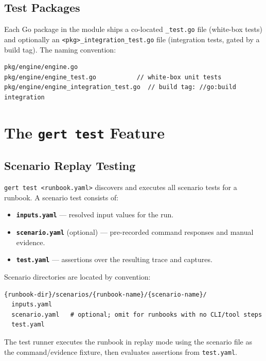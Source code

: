 \subsection{Test Packages}

Each Go package in the module ships a co-located \texttt{\_test.go} file (white-box tests) and optionally an \texttt{<pkg>\_integration\_test.go} file (integration tests, gated by a build tag). The naming convention:

\begin{verbatim}
pkg/engine/engine.go
pkg/engine/engine_test.go           // white-box unit tests
pkg/engine/engine_integration_test.go  // build tag: //go:build integration
\end{verbatim}

\section{The \texttt{gert test} Feature}

\subsection{Scenario Replay Testing}

\texttt{gert test <runbook.yaml>} discovers and executes all scenario tests for a runbook. A scenario test consists of:

\begin{itemize}
  \item \textbf{\texttt{inputs.yaml}} — resolved input values for the run.
  \item \textbf{\texttt{scenario.yaml}} (optional) — pre-recorded command responses and manual evidence.
  \item \textbf{\texttt{test.yaml}} — assertions over the resulting trace and captures.
\end{itemize}

Scenario directories are located by convention:

\begin{verbatim}
{runbook-dir}/scenarios/{runbook-name}/{scenario-name}/
  inputs.yaml
  scenario.yaml   # optional; omit for runbooks with no CLI/tool steps
  test.yaml
\end{verbatim}

The test runner executes the runbook in replay mode using the scenario file as the command/evidence fixture, then evaluates assertions from \texttt{test.yaml}.

